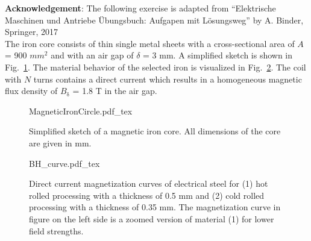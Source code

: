 

\normalsize{\textbf{Acknowledgement}: The following exercise is adapted from ``Elektrische Maschinen und Antriebe Übungsbuch: Aufgapen mit Lösungsweg'' by A. Binder, Springer, 2017}\\




The iron core consists of thin single metal sheets with a cross-sectional area of $A$ = 900 $\si{mm}^2$ and with an air gap of $\delta$ = 3 mm. A simplified sketch is shown in Fig.~\ref{fig:MagneticIronCircle}. The material behavior of the selected iron is visualized in Fig.~\ref{fig:BH_curve}. The coil with $N$ turns contains a direct current which results in a homogeneous magnetic flux density of $B_{\mathrm{\delta}}$ = 1.8 T in the air gap.


\begin{figure}[htb]
    \centering
    {MagneticIronCircle.pdf_tex}
    \caption{Simplified sketch of a magnetic iron core. All dimensions of the core are given in mm.}
    \label{fig:MagneticIronCircle}
\end{figure}

\begin{figure}[htb]
    \centering
    {BH_curve.pdf_tex}
    \caption{Direct current magnetization curves of electrical steel for (1) hot rolled processing with a thickness of 0.5 mm and (2) cold rolled processing with a thickness of 0.35 mm. The magnetization curve in figure on the left side is a zoomed version of material (1) for lower field strengths.}
    \label{fig:BH_curve}
\end{figure}



